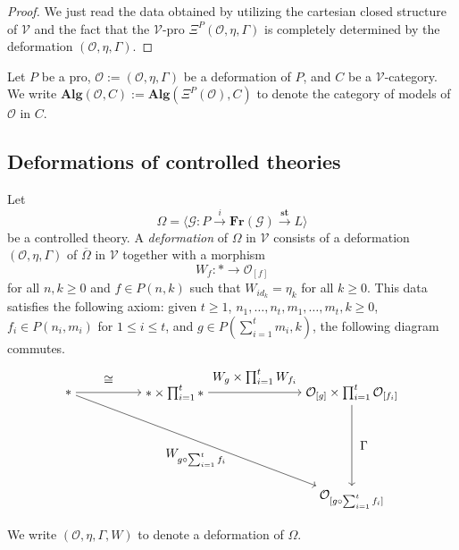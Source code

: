 \documentclass{tac}
\begin{document}
\begin{proof}
We just read the data obtained by utilizing the cartesian closed structure of $\mathcal{V}$ and the fact that the $\mathcal{V}$-pro $\Xi^P(\mathcal{O},\eta,\Gamma)$ is completely determined by the deformation  $(\mathcal{O},\eta,\Gamma)$.
\end{proof}


\begin{notation}
 Let $P$ be a pro, $\mathcal{O}:=(\mathcal{O},\eta,\Gamma)$ be a deformation of $P$, and $C$ be a $\mathcal{V}$-category. We write $\mathbf{Alg}(\mathcal{O},C):=\mathbf{Alg}(\Xi^P(\mathcal{O}),C)$ to denote the category of models of $\mathcal{O}$ in $C$. 
\end{notation}


\subsection*{Deformations of controlled theories}
\begin{definition}
Let
\[
\Omega=\langle \mathcal{G}:P\xrightarrow{i}\mathbf{Fr}(\mathcal{G})\xrightarrow{\mathbf{st}}L\rangle
\]
be a controlled theory. A \emph{deformation} of $\Omega$ in $\mathcal{V}$ consists of a deformation $(\mathcal{O},\eta,\Gamma)$ of $\overline{\Omega}$ in $\mathcal{V}$ together with a morphism 
\[
W_f:*\to \mathcal{O}_{[f]}
\]
for all $n,k\geq 0$ and $f\in P(n,k)$ such that $W_{id_k}=\eta_k$ for all $k\geq 0$. This data satisfies the following axiom: given $t\geq 1$,  $n_1,\dots, n_t,m_1,\dots, m_t,k\geq 0$, $f_i\in P(n_i,m_i)$ for $1\leq i\leq t$, and $g\in P(\sum_{i=1}^tm_i,k)$, the following diagram commutes.
\[
  \begin{tikzpicture}[node distance=3cm, auto]
        \node (A) {$*$};
       \node (B)[right of=A]{$*\times\prod_{i=1}^t*$};
       \node (C)[right of=B,node distance=5cm]{$\mathcal{O}_{[g]}\times\prod_{i=1}^t\mathcal{O}_{[f_i]}$};
       \node (D)[below of=C]{$\mathcal{O}_{[g\circ \sum_{i=1}^tf_i]}$};
       \draw[->] (A) to node[above=3]{$\cong$}(B);
       \draw[->] (B) to node[above=3]{$W_{g}\times \prod_{i=1}^tW_{f_i}$}(C);
       \draw[->](C) to node[right=3]{$\Gamma$}(D);
       \draw[->](A) to node[below=3]{$W_{g\circ \sum_{i=1}^tf_i}$} (D);
    \end{tikzpicture}
\]
We write $(\mathcal{O},\eta,\Gamma, W)$ to denote a deformation of $\Omega$. 
\end{definition}
\end{document}
